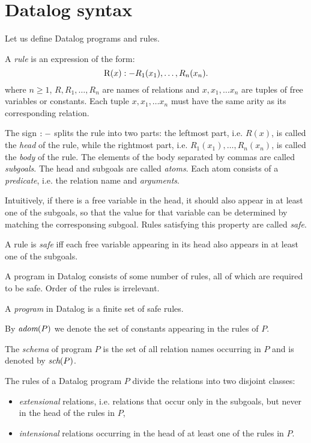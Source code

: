 \section{Datalog syntax}
Let us define Datalog programs and rules.

\begin{defn}[Rule]\label{d:datalogrule}
A \emph{rule} is an expression of the form:
$$ \textsc{R}(x) :- R_1(x_1), \dots, R_n(x_n). $$
where $n \ge 1$, $R, R_1, \dots, R_n$ are names of relations and $x, x_1, \dots x_n$ are tuples of free variables or constants. Each tuple $x, x_1, \dots x_n$ must have the same arity as its corresponding relation.
\end{defn}

The sign $:-$ splits the rule into two parts: the leftmost part, i.e. $R(x)$, is called the \emph{head} of the rule, while the rightmost part, i.e. $R_1(x_1), \dots, R_n(x_n)$, is called the \emph{body} of the rule. The elements of the body separated by commas are called \emph{subgoals}. The head and subgoals are called \emph{atoms}. Each atom consists of a \emph{predicate}, i.e. the relation name and \emph{arguments}.

Intuitively, if there is a free variable in the head, it should also appear in at least one of the subgoals, so that the value for that variable can be determined by matching the corresponsing subgoal. Rules satisfying this property are called \emph{safe}.

\begin{defn}\label{d:datalogsaferule}
A rule is \emph{safe} iff each free variable appearing in its head also appears in at least one of the subgoals.
\end{defn}

A program in Datalog consists of some number of rules, all of which are required to be safe. Order of the rules is irrelevant.

\begin{defn}\label{d:datalogprog}
A \emph{program} in Datalog is a finite set of safe rules.
\end{defn}

By $\textit{adom}(P)$ we denote the set of constants appearing in the rules of $P$.

The \emph{schema} of program $P$ is the set of all relation names occurring in $P$ and is denoted by $\textit{sch}(P)$.

\begin{defn}
The rules of a Datalog program $P$ divide the relations into two disjoint classes: 
\begin{itemize}
\item \emph{extensional} relations, i.e. relations that occur only in the subgoals, but never in the head of the rules in $P$,
\item \emph{intensional} relations occurring in the head of at least one of the rules in $P$.
\end{itemize}
\end{defn}

